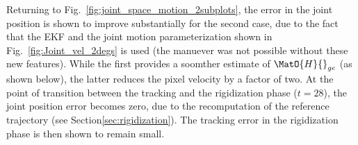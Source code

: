 
Returning to Fig.~\ref{fig:joint_space_motion_2subplots}, the error in the joint position is shown to improve substantially for the second case, due to the fact that the EKF and the joint motion parameterization shown in Fig.~\ref{fig:Joint_vel_2degs} is used (the manuever was not possible without these new features). While the first provides a soomther estimate of $\MatO{H}{}_{ge}$ (as shown below), the latter reduces the pixel velocity by a factor of two. At the point of transition between the tracking and the rigidization phase ($t=28$), the joint position error becomes zero, due to the recomputation of the reference trajectory (see Section\ref{sec:rigidization}). The tracking error in the rigidization phase is then shown to remain small.


